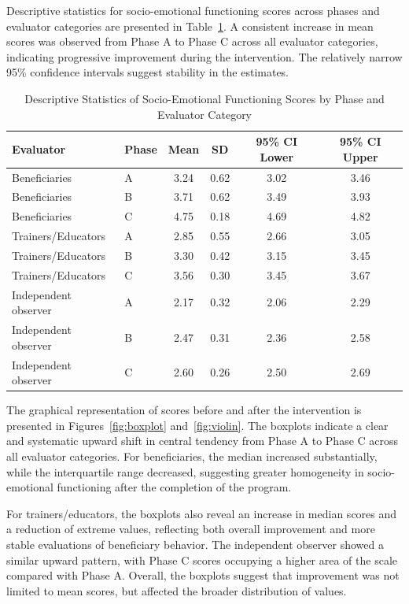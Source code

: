 \documentclass[12pt,a4paper]{article}
\begin{document}
Descriptive statistics for socio-emotional functioning scores across phases and evaluator categories are presented in Table~\ref{tab:descriptive_statistics}. A consistent increase in mean scores was observed from Phase A to Phase C across all evaluator categories, indicating progressive improvement during the intervention. The relatively narrow 95\% confidence intervals suggest stability in the estimates.

\begin{table}[!t]
\caption{Descriptive Statistics of Socio-Emotional Functioning Scores by Phase and Evaluator Category}
\label{tab:descriptive_statistics}
\centering
\begin{tabular}{llcccc}
\hline
\textbf{Evaluator} & \textbf{Phase} & \textbf{Mean} & \textbf{SD} & \textbf{95\% CI Lower} & \textbf{95\% CI Upper} \\
\hline
Beneficiaries & A & 3.24 & 0.62 & 3.02 & 3.46 \\
Beneficiaries & B & 3.71 & 0.62 & 3.49 & 3.93 \\
Beneficiaries & C & 4.75 & 0.18 & 4.69 & 4.82 \\
Trainers/Educators & A & 2.85 & 0.55 & 2.66 & 3.05 \\
Trainers/Educators & B & 3.30 & 0.42 & 3.15 & 3.45 \\
Trainers/Educators & C & 3.56 & 0.30 & 3.45 & 3.67 \\
Independent observer & A & 2.17 & 0.32 & 2.06 & 2.29 \\
Independent observer & B & 2.47 & 0.31 & 2.36 & 2.58 \\
Independent observer & C & 2.60 & 0.26 & 2.50 & 2.69 \\
\hline
\end{tabular}
\end{table}


The graphical representation of scores before and after the intervention is presented in Figures~\ref{fig:boxplot} and~\ref{fig:violin}. The boxplots indicate a clear and systematic upward shift in central tendency from Phase A to Phase C across all evaluator categories. For beneficiaries, the median increased substantially, while the interquartile range decreased, suggesting greater homogeneity in socio-emotional functioning after the completion of the program.

For trainers/educators, the boxplots also reveal an increase in median scores and a reduction of extreme values, reflecting both overall improvement and more stable evaluations of beneficiary behavior. The independent observer showed a similar upward pattern, with Phase C scores occupying a higher area of the scale compared with Phase A. Overall, the boxplots suggest that improvement was not limited to mean scores, but affected the broader distribution of values.
\end{document}
